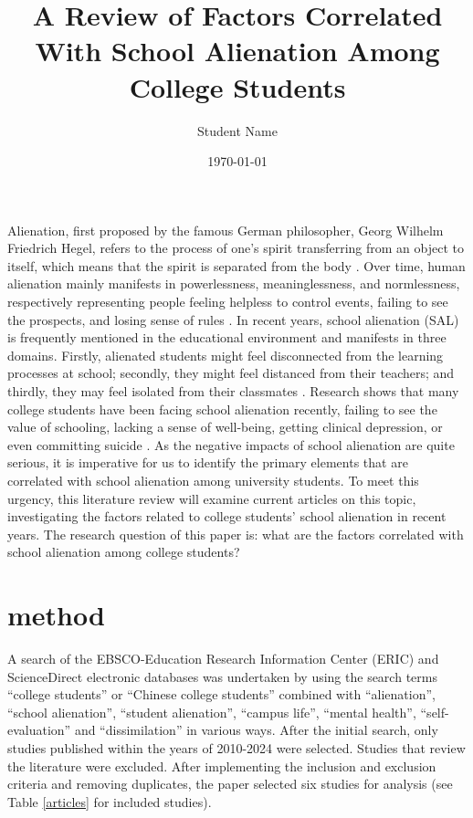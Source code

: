 \documentclass{scupi_apa_thesis}
\title{A Review of Factors Correlated With School Alienation Among College Students}
\author{Student Name}
\institute{Sichuan University-Pittsburgh Institute}
\date{\today}
\begin{document}
\maketitle
\par
Alienation, first proposed by the famous German philosopher, Georg Wilhelm Friedrich Hegel, refers to the process of one's spirit transferring from an object to itself, which means that the spirit is separated from the body \cite{hegel2018phenomenology}. 
Over time, human alienation mainly manifests in powerlessness, meaninglessness, and normlessness, respectively representing people feeling helpless to control events, failing to see the prospects, and losing sense of rules \cite{brown2003secondary}. 
In recent years, school alienation (SAL) is frequently mentioned in the educational environment and manifests in three domains. 
Firstly, alienated students might feel disconnected from the learning processes at school; secondly, they might feel distanced from their teachers; 
and thirdly, they may feel isolated from their classmates \cite{morinaj2018school}. 
Research shows that many college students have been facing school alienation recently, failing to see the value of schooling, lacking a sense of well-being, getting clinical depression, or even committing suicide \cite{zhang2003daxuesheng}. 
As the negative impacts of school alienation are quite serious, it is imperative for us to identify the primary elements that are correlated with school alienation among university students. 
To meet this urgency, this literature review will examine current articles on this topic, investigating the factors related to college students’ school alienation in recent years. 
The research question of this paper is: what are the factors correlated with school 
alienation among college students? 

\section{method}
A search of the EBSCO-Education Research Information Center (ERIC) and ScienceDirect electronic databases was undertaken by using the search terms “college students” or “Chinese college students” combined with “alienation”, “school alienation”, “student alienation”, “campus life”, “mental health”, “self-evaluation” and “dissimilation” in various ways. 
After the initial search, only studies published within the years of 2010-2024 were selected. 
Studies that review the literature were excluded. 
After implementing the inclusion and exclusion criteria and removing duplicates, the paper selected six studies for analysis (see Table \ref{articles} for included studies).
\end{document}
